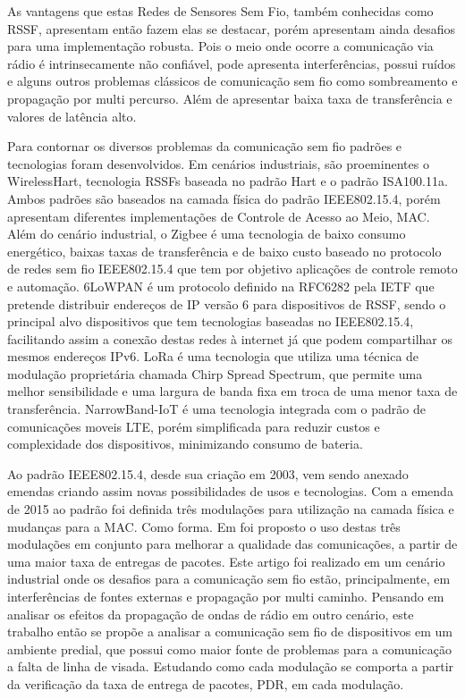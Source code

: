 As vantagens que estas Redes de Sensores Sem Fio, também conhecidas como RSSF, apresentam então fazem elas se destacar, porém apresentam ainda desafios para uma implementação robusta. Pois o meio onde ocorre a comunicação via rádio é intrinsecamente não confiável, pode apresenta interferências, possui ruídos e alguns outros problemas clássicos de comunicação sem fio como sombreamento e propagação por multi percurso. Além de apresentar baixa taxa de transferência e valores de latência alto\cite{gomes2017estimaccao}.

Para contornar os diversos problemas da comunicação sem fio padrões e tecnologias foram desenvolvidos. Em cenários industriais, são proeminentes o WirelessHart, tecnologia RSSFs baseada no padrão Hart\cite{WIHART} e o padrão ISA100.11a. Ambos padrões são baseados na camada física do padrão IEEE802.15.4, porém apresentam diferentes implementações de Controle de Acesso ao Meio\cite{gomes2017estimaccao}, MAC. Além do cenário industrial, o Zigbee é uma tecnologia de baixo consumo energético, baixas taxas de transferência e de baixo custo baseado no protocolo de redes sem fio IEEE802.15.4 que tem por objetivo aplicações de controle remoto e automação\cite{ergen2004zigbee}. 6LoWPAN é um protocolo definido na RFC6282 pela IETF que pretende distribuir endereços de IP versão 6 para dispositivos de RSSF, sendo o principal alvo dispositivos que tem tecnologias baseadas no IEEE802.15.4, facilitando assim a conexão destas redes à internet já que podem compartilhar os mesmos endereços IPv6\cite{olsson20146lowpan}. LoRa é uma tecnologia que utiliza uma técnica de modulação proprietária chamada Chirp Spread Spectrum, que permite uma melhor sensibilidade e uma largura de banda fixa em troca de uma menor taxa de transferência\cite{sinha2017survey}. NarrowBand-IoT é uma tecnologia integrada com o padrão de comunicações moveis LTE, porém simplificada para reduzir custos e complexidade dos dispositivos, minimizando consumo de bateria\cite{sinha2017survey}.

Ao padrão IEEE802.15.4, desde sua criação em 2003, vem sendo anexado emendas criando assim novas possibilidades de usos e tecnologias. Com a emenda de 2015 ao padrão foi definida três modulações para utilização na camada física e mudanças para a MAC\cite{chang2012ieee}. Como forma. Em \cite{tuset2020reliability} foi proposto o uso destas três modulações em conjunto para melhorar a qualidade das comunicações, a partir de uma maior taxa de entregas de pacotes. Este artigo foi realizado em um cenário industrial onde os desafios para a comunicação sem fio estão, principalmente, em interferências de fontes externas e propagação por multi caminho. Pensando em analisar os efeitos da propagação de ondas de rádio em outro cenário, este trabalho então se propõe a analisar a comunicação sem fio de dispositivos em um ambiente predial, que possui como maior fonte de problemas para a comunicação a falta de linha de visada. Estudando como cada modulação se comporta a partir da verificação da taxa de entrega de pacotes, PDR, em cada modulação.